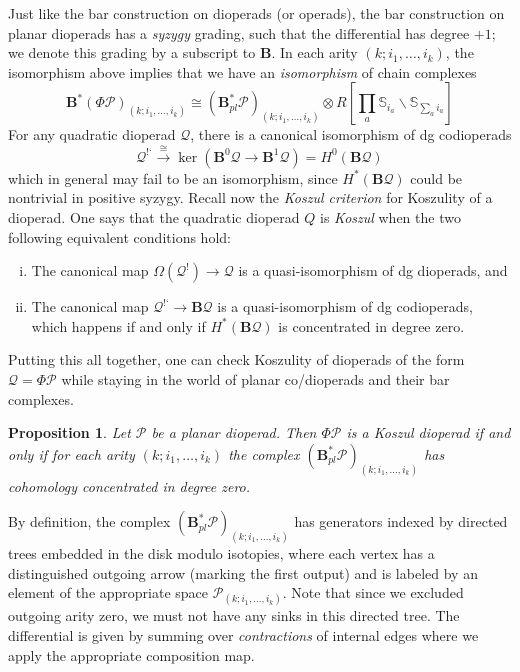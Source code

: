 \documentclass[11pt,a4paper]{amsart}
\renewcommand{\SS}{\ensuremath{\mathbb{S}}}
\newcommand{\scrP}{\mathscr{P}}
\newcommand{\scrQ}{\mathscr{Q}}
\newcommand{\antish}{\ensuremath{\mbox{!`}}}
\newtheorem{proposition}[theorem]{Proposition}
\theoremstyle{definition}
\begin{document}
Just like the bar construction on dioperads (or operads), the bar construction on planar dioperads has a \emph{syzygy} grading, such that the differential has degree $+1$; we denote this grading by a subscript to $\mathbf{B}$. In each arity $(k;i_1,\dots,i_k)$, the isomorphism above implies that we have an \emph{isomorphism} of chain complexes
\[\mathbf{B}^*(\Phi \scrP)_{(k;i_1,\dots,i_k)} \cong (\mathbf{B}^*_{pl} \scrP)_{(k;i_1,\dots,i_k)} \otimes R\left[\textstyle{\prod}_a \SS_{i_a}\backslash \SS_{\sum_a i_a} \right] \]
For any quadratic dioperad $\mathscr{Q}$, there is a canonical isomorphism of dg codioperads
\[ \mathscr{Q}^{\antish} \xrightarrow{\cong} \ker(\mathbf{B}^0 \mathscr{Q} \to \mathbf{B}^1 \mathscr{Q}) = H^0(\mathbf{B}\mathscr{Q}) \]
which in general may fail to be an isomorphism, since $H^*(\mathbf{B}\mathscr{Q})$ could be nontrivial in positive syzygy. Recall now the \emph{Koszul criterion} for Koszulity of a dioperad. One says that the quadratic dioperad $Q$ is \emph{Koszul} when the two following equivalent conditions hold:
\begin{enumerate}[i.]
    \item The canonical map $\Omega(\mathscr{Q}^!) \to \mathscr{Q}$ is a quasi-isomorphism of dg dioperads, and
    \item The canonical map $\mathscr{Q}^{\antish} \to \mathbf{B} \mathscr{Q}$ is a quasi-isomorphism of dg codioperads, which happens if and only if $H^*(\mathbf{B}\mathscr{Q})$ is concentrated in degree zero.
\end{enumerate}
Putting this all together, one can check Koszulity of dioperads of the form $\scrQ = \Phi \scrP$ while staying in the world of planar co/dioperads and their bar complexes.
\begin{proposition}\label{prop:KoszulDiop}
    Let $\scrP$ be a planar dioperad. Then $\Phi \scrP$ is a Koszul dioperad if and only if for each arity $(k;i_1,\dots,i_k)$ the complex $(\mathbf{B}^*_{pl} \scrP)_{(k;i_1,\dots,i_k)}$ has cohomology concentrated in degree zero.
\end{proposition}

\noindent By definition, the complex $(\mathbf{B}^*_{pl} \scrP)_{(k;i_1,\dots,i_k)}$ has generators indexed by directed trees embedded in the disk modulo isotopies, where each vertex has a distinguished outgoing arrow (marking the first output) and is labeled by an element of the appropriate space $\scrP_{(k;i_1,\dots,i_k)}$. Note that since we excluded outgoing arity zero, we must not have any sinks in this directed tree. The differential is given by summing over \emph{contractions} of internal edges where we apply the appropriate composition map.
\end{document}
